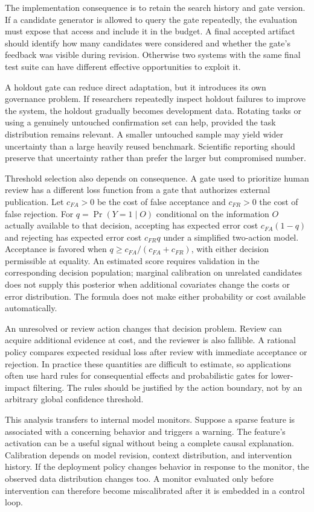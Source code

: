 The implementation consequence is to retain the search history and gate version. If a candidate generator is allowed to query the gate repeatedly, the evaluation must expose that access and include it in the budget. A final accepted artifact should identify how many candidates were considered and whether the gate's feedback was visible during revision. Otherwise two systems with the same final test suite can have different effective opportunities to exploit it.

A holdout gate can reduce direct adaptation, but it introduces its own governance problem. If researchers repeatedly inspect holdout failures to improve the system, the holdout gradually becomes development data. Rotating tasks or using a genuinely untouched confirmation set can help, provided the task distribution remains relevant. A smaller untouched sample may yield wider uncertainty than a large heavily reused benchmark. Scientific reporting should preserve that uncertainty rather than prefer the larger but compromised number.

Threshold selection also depends on consequence. A gate used to prioritize human review has a different loss function from a gate that authorizes external publication. Let $c_{FA}>0$ be the cost of false acceptance and $c_{FR}>0$ the cost of false rejection. For $q=\Pr(Y=1\mid O)$ conditional on the information $O$ actually available to that decision, accepting has expected error cost $c_{FA}(1-q)$ and rejecting has expected error cost $c_{FR}q$ under a simplified two-action model. Acceptance is favored when $q\geq c_{FA}/(c_{FA}+c_{FR})$, with either decision permissible at equality. An estimated score requires validation in the corresponding decision population; marginal calibration on unrelated candidates does not supply this posterior when additional covariates change the costs or error distribution. The formula does not make either probability or cost available automatically.

An unresolved or review action changes that decision problem. Review can acquire additional evidence at cost, and the reviewer is also fallible. A rational policy compares expected residual loss after review with immediate acceptance or rejection. In practice these quantities are difficult to estimate, so applications often use hard rules for consequential effects and probabilistic gates for lower-impact filtering. The rules should be justified by the action boundary, not by an arbitrary global confidence threshold.

This analysis transfers to internal model monitors. Suppose a sparse feature is associated with a concerning behavior and triggers a warning. The feature's activation can be a useful signal without being a complete causal explanation. Calibration depends on model revision, context distribution, and intervention history. If the deployment policy changes behavior in response to the monitor, the observed data distribution changes too. A monitor evaluated only before intervention can therefore become miscalibrated after it is embedded in a control loop.

